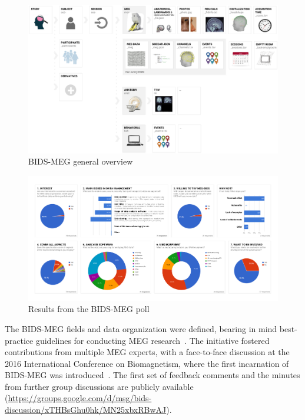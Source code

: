\begin{figure}
\begin{center}
   \includegraphics[width=\linewidth]{figures/bids_structure.png}
\end{center}
   \caption[BIDS-MEG general overview]{ BIDS-MEG general overview}
   \label{fig:BIDS-MEG-overview}
\end{figure}

\begin{figure}
\begin{center}
   \includegraphics[width=\linewidth]{figures/MEG-BIDS_poll_results_figure.pdf}
\end{center}
   \caption[Results from the BIDS-MEG poll.]{Results from the BIDS-MEG poll}
   \label{fig:BIDS-MEG-poll}
\end{figure}

The BIDS-MEG fields and data organization were defined, bearing in mind best-practice guidelines for conducting MEG research~\citep{gross2013good}. The initiative fostered contributions from multiple MEG experts, with a face-to-face discussion at the 2016 International Conference on Biomagnetism, where the first incarnation of BIDS-MEG was introduced~\citep{niso2016megbids}. The first set of feedback comments and the minutes from further group discussions are publicly available
(\url{https://groups.google.com/d/msg/bids-discussion/xTHBsGhu0hk/MN25xbxRBwAJ}).

